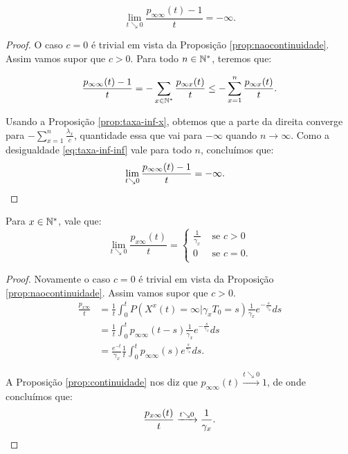 \begin{proposicao}
  \label{prop:taxa-inf-inf}
  \begin{displaymath}
    \lim_{t \searrow 0} \frac{p_{\infty \infty}(t) - 1}{t} = -\infty.
  \end{displaymath}
\end{proposicao}
\begin{proof}
  O caso $c = 0$ é trivial em vista da Proposição
  \ref{prop:naocontinuidade}. Assim vamos supor que $c > 0$.
  Para todo $n \in {\mathbb{N^*}}$, teremos que:

  \begin{equation}
    \label{eq:taxa-inf-inf}
    \frac{p_{\infty \infty} (t) - 1}{t} = - \sum_{x \in {\mathbb{N^*}}}
    \frac{p_{\infty x} (t)}{t} \leq - \sum_{x = 1}^n \frac{p_{\infty
        x} (t)}{t}.
  \end{equation}
  
  Usando a Proposição \ref{prop:taxa-inf-x}, obtemos que a parte da
  direita converge para $-\sum_{x = 1}^n \frac{\lambda_x}{c}$,
  quantidade essa que vai para $-\infty$ quando $n \to \infty$. Como a
  desigualdade \eqref{eq:taxa-inf-inf} vale para todo $n$, concluímos que:
  \begin{align*}
    \lim_{t \searrow 0}\frac{p_{\infty \infty} (t) - 1}{t} &= -
    \infty.
    \qedhere
  \end{align*}
\end{proof}

\begin{proposicao}
  \label{prop:taxa-x-inf}
  Para $x \in {\mathbb{N^*}}$, vale que:
  \begin{displaymath}
    \lim_{t \searrow 0} \frac{p_{x \infty}(t)}{t} = \begin{cases}
      \frac{1}{\gamma_x} & \textrm{ se } c > 0 \\
      0 & \textrm{ se } c = 0 . \\
    \end{cases}
  \end{displaymath}
\end{proposicao}
\begin{proof}
  Novamente o caso $c = 0$ é trivial em vista da Proposição
  \ref{prop:naocontinuidade}. Assim vamos supor que $c > 0$.
  \begin{align*}
    \frac{p_{x \infty}}{t}
    &= \frac{1}{t} \int_0^t P(X^x (t) = \infty | \gamma_x
    T_0 = s) \frac{1}{\gamma_x}e^{-\frac{s}{\gamma_x}} ds\\
    &= \frac{1}{t} \int_0^t p_{\infty \infty} (t-s)
    \frac{1}{\gamma_x}e^{-\frac{s}{\gamma_x}} ds\\
    &= \frac{e^{-t}}{\gamma_x} \frac{1}{t} \int_0^t p_{\infty \infty} (s)
    e^{\frac{s}{\gamma_x}} ds .
  \end{align*}

  A Proposição \ref{prop:continuidade} nos diz que $p_{\infty \infty}
  (t) \xrightarrow{t \searrow 0} 1$, de onde concluímos que:
   \begin{displaymath}
    \frac{p_{x \infty}(t)}{t} \xrightarrow{t \searrow 0} 
    \frac{1}{\gamma_x}.
    \qedhere
  \end{displaymath}
\end{proof}

